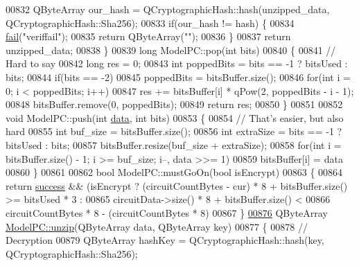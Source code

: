 \begin{DoxyCode}
{00832     QByteArray our\_hash = QCryptographicHash::hash(unzipped\_data, QCryptographicHash::Sha256);
00833     \textcolor{keywordflow}{if}(our\_hash != hash) \{
00834         \hyperlink{class_model_p_c_a47464b59b7e37fcee25e55475708aabd}{fail}(\textcolor{stringliteral}{"veriffail"});
00835         \textcolor{keywordflow}{return} QByteArray(\textcolor{stringliteral}{""});
00836     \}
00837     \textcolor{keywordflow}{return} unzipped\_data;
00838 \}
00839 \textcolor{keywordtype}{long} ModelPC::pop(\textcolor{keywordtype}{int} bits)
00840 \{
00841     \textcolor{comment}{// Hard to say}
00842     \textcolor{keywordtype}{long} res = 0;
00843     \textcolor{keywordtype}{int} poppedBits = bits == -1 ? bitsUsed : bits;
00844     \textcolor{keywordflow}{if}(bits == -2)
00845         poppedBits = bitsBuffer.size();
00846     \textcolor{keywordflow}{for}(\textcolor{keywordtype}{int} i = 0; i < poppedBits; i++)
00847         res += bitsBuffer[i] * qPow(2, poppedBits - i - 1);
00848     bitsBuffer.remove(0, poppedBits);
00849     \textcolor{keywordflow}{return} res;
00850 \}
00851 
00852 \textcolor{keywordtype}{void} ModelPC::push(\textcolor{keywordtype}{int} \hyperlink{namespace_errors_dict_setup_adf4c30d205d29df7343e26f7c62b0685}{data}, \textcolor{keywordtype}{int} bits)
00853 \{
00854     \textcolor{comment}{// That's easier, but also hard}
00855     \textcolor{keywordtype}{int} buf\_size = bitsBuffer.size();
00856     \textcolor{keywordtype}{int} extraSize = bits == -1 ? bitsUsed : bits;
00857     bitsBuffer.resize(buf\_size + extraSize);
00858     \textcolor{keywordflow}{for}(\textcolor{keywordtype}{int} i = bitsBuffer.size() - 1; i >= buf\_size; i--, data >>= 1)
00859         bitsBuffer[i] = data %
00860 \}
00861 
00862 \textcolor{keywordtype}{bool} ModelPC::mustGoOn(\textcolor{keywordtype}{bool} isEncrypt)
00863 \{
00864     \textcolor{keywordflow}{return} \hyperlink{class_model_p_c_a945ffbbc44a832b953c191debd448f4c}{success} && (isEncrypt ? (circuitCountBytes - cur) * 8 + bitsBuffer.size() >= bitsUsed * 3
       :
00865                                    circuitData->size() * 8 + bitsBuffer.size() <
00866                                    circuitCountBytes * 8 - (circuitCountBytes * 8)%
00867 \}
\hypertarget{modelpc_8cpp_source_l00876}{}\hyperlink{class_model_p_c_a6da88f166785a49f73b22c169f956fd0}{00876} QByteArray \hyperlink{class_model_p_c_a6da88f166785a49f73b22c169f956fd0}{ModelPC::unzip}(QByteArray data, QByteArray key)
00877 \{
00878     \textcolor{comment}{// Decryption}
00879     QByteArray hashKey = QCryptographicHash::hash(key, QCryptographicHash::Sha256);
}
\end{DoxyCode}
